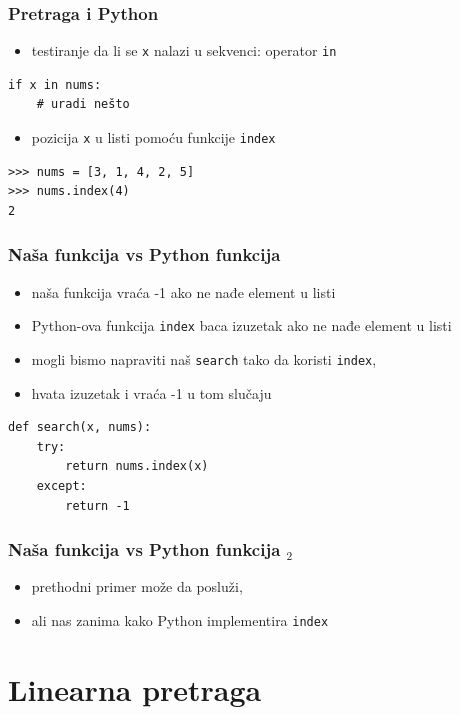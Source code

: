 \documentclass[utf8,compress]{beamer}
\begin{document}
\begin{frame}[fragile]
  \frametitle{Pretraga i Python}
  \begin{itemize}
    \item testiranje da li se \texttt{x} nalazi u sekvenci: operator \texttt{in}
  \end{itemize}
\begin{verbatim}
if x in nums:
    # uradi nešto
\end{verbatim}
  \begin{itemize}
    \item pozicija \texttt{x} u listi pomoću funkcije \texttt{index}
  \end{itemize}
\begin{verbatim}
>>> nums = [3, 1, 4, 2, 5]
>>> nums.index(4)
2
\end{verbatim}
\end{frame}

\begin{frame}[fragile]
  \frametitle{Naša funkcija vs Python funkcija}
  \begin{itemize}
    \item naša funkcija vraća -1 ako ne nađe element u listi
    \item Python-ova funkcija \texttt{index} baca izuzetak ako ne nađe element u listi
    \item mogli bismo napraviti naš \texttt{search} tako da koristi \texttt{index},
    \item hvata izuzetak i vraća -1 u tom slučaju
  \end{itemize}
\begin{verbatim}
def search(x, nums):
    try:
        return nums.index(x)
    except:
        return -1
\end{verbatim}
\end{frame}

\begin{frame}[fragile]
  \frametitle{Naša funkcija vs Python funkcija $_2$}
  \begin{itemize}
    \item prethodni primer može da posluži,
    \item ali nas zanima kako Python implementira \texttt{index}
  \end{itemize}
\end{frame}

\section[Linearna]{Linearna pretraga}
\end{document}

